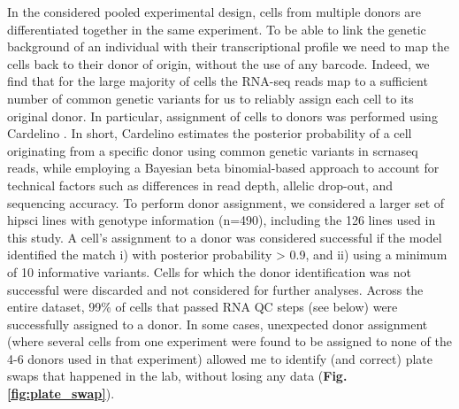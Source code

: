 In the considered pooled experimental design, cells from multiple donors are differentiated together in the same experiment. 
To be able to link the genetic background of an individual with their transcriptional profile we need to map the cells back to their donor of origin, without the use of any barcode.
Indeed, we find that for the large majority of cells the RNA-seq reads map to a sufficient number of common genetic variants for us to reliably assign each cell to its original donor.
In particular, assignment of cells to donors was performed using Cardelino \cite{mccarthy2020cardelino}. 
In short, Cardelino estimates the posterior probability of a cell originating from a specific donor using common genetic variants in \gls{scrnaseq} reads, while employing a Bayesian beta binomial-based approach to account for technical factors such as differences in read depth, allelic drop-out, and sequencing accuracy. 
To perform donor assignment, we considered a larger set of \gls{hipsci} lines with genotype information (n=490), including the 126 lines used in this study. 
A cell's assignment to a donor was considered successful if the model identified the match i) with posterior probability > 0.9, and ii) using a minimum of 10 informative variants. 
Cells for which the donor identification was not successful were discarded and not considered for further analyses.
Across the entire dataset, 99\% of cells that passed RNA QC steps (see below) were successfully assigned to a donor.
In some cases, unexpected donor assignment (where several cells from one experiment were found to be assigned to none of the 4-6 donors used in that experiment) allowed me to identify (and correct) plate swaps that happened in the lab, without losing any data (\textbf{Fig. \ref{fig:plate_swap}}).

